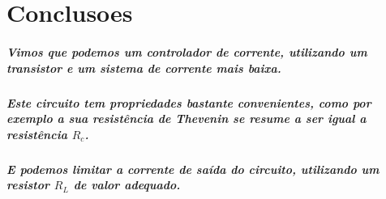 \documentclass[12pt,twoside, a4paper, twocolumn]{article}
\begin{document}
\section{Conclusoes}

\subparagraph*{Vimos que podemos um controlador de corrente, utilizando um transistor e um sistema de corrente mais baixa.}

\subparagraph*{Este circuito tem propriedades bastante convenientes, como por exemplo a sua resistência de Thevenin se resume a ser igual a resistência $R_c$.}

\subparagraph*{E podemos limitar a corrente de saída do circuito, utilizando um resistor $R_L$ de valor adequado.}
\end{document}
